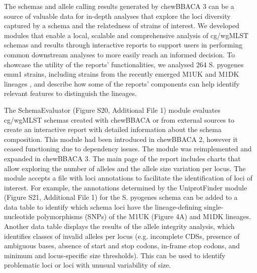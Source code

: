 The schemas and allele calling results generated by chewBBACA 3 can be a source of valuable data for in-depth analyses that explore the loci diversity captured by a schema and the relatedness of strains of interest. We developed modules that enable a local, scalable and comprehensive analysis of cg/wgMLST schemas and results through interactive reports to support users in performing common downstream analyses to more easily reach an informed decision. To showcase the utility of the reports' functionalities, we analysed 264 S. pyogenes emm1 strains, including strains from the recently emerged M1UK and M1DK lineages \citep{lynskey_emergence_2019, johannesen_increase_2023}, and describe how some of the reports’ components can help identify relevant features to distinguish the lineages.

The SchemaEvaluator (Figure S20, Additional File 1) module evaluates cg/wgMLST schemas created with chewBBACA or from external sources to create an interactive report with detailed information about the schema composition. This module had been introduced in chewBBACA 2, however it ceased functioning due to dependency issues. The module was reimplemented and expanded in chewBBACA 3. The main page of the report includes charts that allow exploring the number of alleles and the allele size variation per locus. The module accepts a file with loci annotations to facilitate the identification of loci of interest. For example, the annotations determined by the UniprotFinder module (Figure S21, Additional File 1) for the S. pyogenes schema can be added to a data table to identify which schema loci have the lineage-defining single-nucleotide polymorphisms (SNPs) of the M1UK (Figure 4A) and M1DK lineages. Another data table displays the results of the allele integrity analysis, which identifies classes of invalid alleles per locus (e.g. incomplete CDSs, presence of ambiguous bases, absence of start and stop codons, in-frame stop codons, and minimum and locus-specific size thresholds). This can be used to identify problematic loci or loci with unusual variability of size.


